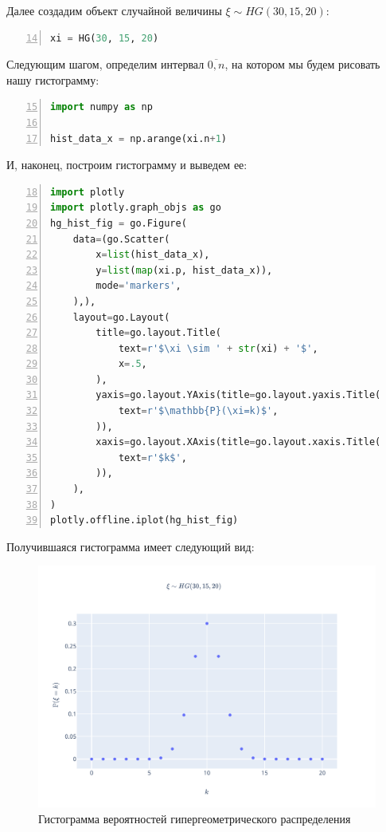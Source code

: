 \documentclass[
  russian,
  a4paper,
]{article}
\begin{document}
Далее создадим объект случайной величины \(\xi \sim HG(30, 15, 20)\):

\begin{lstlisting}[language=Python, numbers=left, firstnumber=14]
xi = HG(30, 15, 20)
\end{lstlisting}

Следующим шагом, определим интервал \(\overline{0, n}\), на котором мы
будем рисовать нашу гистограмму:

\begin{lstlisting}[language=Python, numbers=left, firstnumber=15]
import numpy as np

hist_data_x = np.arange(xi.n+1)
\end{lstlisting}

И, наконец, построим гистограмму и выведем ее:

\begin{lstlisting}[language=Python, numbers=left, firstnumber=18]
import plotly
import plotly.graph_objs as go
hg_hist_fig = go.Figure(
    data=(go.Scatter(
        x=list(hist_data_x),
        y=list(map(xi.p, hist_data_x)),
        mode='markers',
    ),),
    layout=go.Layout(
        title=go.layout.Title(
            text=r'$\xi \sim ' + str(xi) + '$',
            x=.5,
        ),
        yaxis=go.layout.YAxis(title=go.layout.yaxis.Title(
            text=r'$\mathbb{P}(\xi=k)$',
        )),
        xaxis=go.layout.XAxis(title=go.layout.xaxis.Title(
            text=r'$k$',
        )),
    ),
)
plotly.offline.iplot(hg_hist_fig)
\end{lstlisting}

Получившаяся гистограмма имеет следующий вид:

\begin{figure}
\centering
\includegraphics{../assets/hg_hist.svg}
\caption{Гистограмма вероятностей гипергеометрического распределения}
\end{figure}
\end{document}
